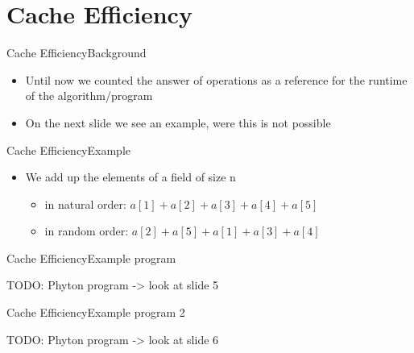 \section{Cache Efficiency}


\begin{frame}{Cache Efficiency}{Background}
	\begin{itemize}
		\item
			Until now we counted the answer of operations as a reference for the 
			runtime of the algorithm/program
		\item
			On the next slide we see an example, were this is not possible
	\end{itemize}
\end{frame}


\begin{frame}{Cache Efficiency}{Example}
	\begin{itemize}
		\item
			We add up the elements of a field of size n
		\begin{itemize}
			\item
				in natural order: $a[1] + a[2] + a[3] + a[4] + a[5]$
			\item
				in random order: $a[2] + a[5] + a[1] + a[3] + a[4]$
		\end{itemize}
	\end{itemize}
\end{frame}


\begin{frame}{Cache Efficiency}{Example program}

TODO: Phyton program -> look at slide 5 \vspace{2em}

\end{frame}


\begin{frame}{Cache Efficiency}{Example program 2}

TODO: Phyton program -> look at slide 6 \vspace{2em}

\end{frame}


